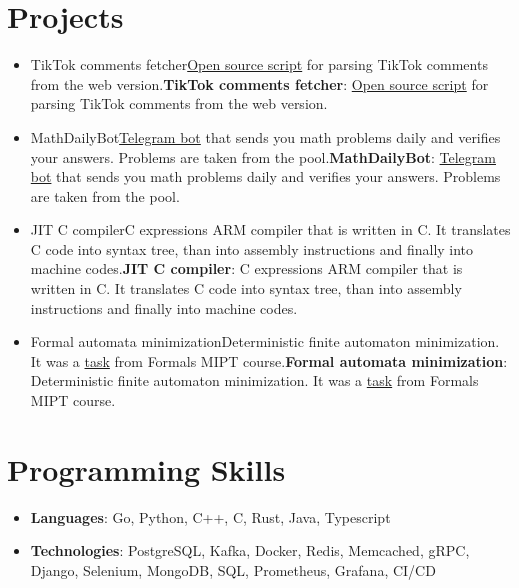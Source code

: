 \documentclass[letterpaper,11pt]{article}
\def \ifempty#1{\def\temp{#1} \ifx\temp\empty }
\newcommand{\resumeItem}[2]{
  \item\small{
  	\ifempty{#1}#2\else\textbf{#1}{: #2 \vspace{-2pt}}\fi
  }
}
\newcommand{\resumeSubItem}[2]{\resumeItem{#1}{#2}\vspace{-4pt}}
\newcommand{\resumeSubHeadingListStart}{\begin{itemize}[leftmargin=*]}
\newcommand{\resumeSubHeadingListEnd}{\end{itemize}}
\begin{document}
\section{Projects}
  \resumeSubHeadingListStart
    \resumeSubItem{TikTok comments fetcher}
      {\href{https://github.com/romanovsavelij/TikTokCommentsFetcher}{Open source script} for parsing TikTok comments from the web version.}
    \resumeSubItem{MathDailyBot}
      {\href{https://github.com/romanovsavelij/MathDailyBot}{Telegram bot} that sends you math problems daily and verifies your answers. Problems are taken from the pool.}
    \resumeSubItem{JIT C compiler}
      {C expressions ARM compiler that is written in C. It translates C code into syntax tree, than into assembly instructions and finally into machine codes.}
    \resumeSubItem{Formal automata minimization}
    {Deterministic finite automaton minimization. It was a \href{https://github.com/romanovsavelij/FormalAutomataMinimization}{task} from Formals MIPT course.}
  \resumeSubHeadingListEnd

%
\section{Programming Skills}
 \resumeSubHeadingListStart
   \item{
     \textbf{Languages}{: Go, Python, C++, C, Rust, Java, Typescript }
   }
   \item {
     \textbf{Technologies}{: PostgreSQL, Kafka, Docker, Redis, Memcached, gRPC, Django, Selenium, MongoDB, SQL, Prometheus, Grafana, CI/CD}
   }
 \resumeSubHeadingListEnd


\end{document}
